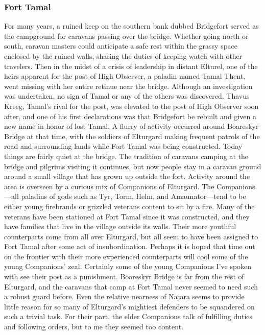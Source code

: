 \documentclass[10pt,a4paper,twoside,twocolumn,openany,bg=print,nodeprecatedcode]{dndbook}
\begin{document}
\subsubsection{Fort Tamal}
For many years, a ruined keep on the southern bank dubbed Bridgefort served as the campground for caravans passing over the bridge. Whether going north or south, caravan masters could anticipate a safe rest within the grassy space enclosed by the ruined walls, sharing the duties of keeping watch with other travelers.
Then in the midst of a crisis of leadership in distant Elturel, one of the heirs apparent for the post of High Observer, a paladin named Tamal Thent, went missing with her entire retinue near the bridge. Although an investigation was undertaken, no sign of Tamal or any of the others was discovered. Thavus Kreeg, Tamal's rival for the post, was elevated to the post of High Observer soon after, and one of his first declarations was that Bridgefort be rebuilt and given a new name in honor of lost Tamal.
A flurry of activity occurred around Boareskyr Bridge at that time, with the soldiers of Elturgard making frequent patrols of the road and surrounding lands while Fort Tamal was being constructed. Today things are fairly quiet at the bridge. The tradition of caravans camping at the bridge and pilgrims visiting it continues, but now people stay in a caravan ground around a small village that has grown up outside the fort.
Activity around the area is overseen by a curious mix of Companions of Elturgard. The Companions—all paladins of gods such as Tyr, Torm, Helm, and Amaunator—tend to be either young firebrands or grizzled veterans content to sit by a fire. Many of the veterans have been stationed at Fort Tamal since it was constructed, and they have families that live in the village outside its walls. Their more youthful counterparts come from all over Elturgard, but all seem to have been assigned to Fort Tamal after some act of insubordination. Perhaps it is hoped that time out on the frontier with their more experienced counterparts will cool some of the young Companions' zeal.
Certainly some of the young Companions I've spoken with see their post as a punishment. Boareskyr Bridge is far from the rest of Elturgard, and the caravans that camp at Fort Tamal never seemed to need such a robust guard before. Even the relative nearness of Najara seems to provide little reason for so many of Elturgard's mightiest defenders to be squandered on such a trivial task. For their part, the elder Companions talk of fulfilling duties and following orders, but to me they seemed too content.
\end{document}
